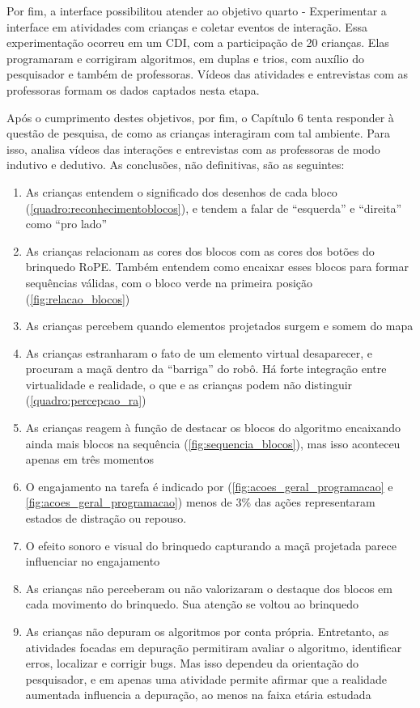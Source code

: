 Por fim, a interface possibilitou atender ao objetivo quarto - Experimentar a interface em atividades com crianças e coletar eventos de interação. Essa experimentação ocorreu em um CDI, com a participação de 20 crianças. Elas programaram e corrigiram algoritmos, em duplas e trios, com auxílio do pesquisador e também de professoras. Vídeos das atividades e entrevistas com as professoras formam os dados captados nesta etapa.

Após o cumprimento destes objetivos, por fim, o Capítulo 6 tenta responder à questão de pesquisa, de como as crianças interagiram com tal ambiente. Para isso, analisa vídeos das interações e entrevistas com as professoras de modo indutivo e dedutivo. As conclusões, não definitivas, são as seguintes:

\begin{enumerate}
    \item As crianças entendem o significado dos desenhos de cada bloco (\autoref{quadro:reconhecimentoblocos}), e tendem a falar de “esquerda” e “direita” como “pro lado”
    \item As crianças relacionam as cores dos blocos com as cores dos botões do brinquedo RoPE. Também entendem como encaixar esses blocos para formar sequências válidas, com o bloco verde na primeira posição (\autoref{fig:relacao_blocos})
    \item As crianças percebem quando elementos projetados surgem e somem do mapa
    \item As crianças estranharam o fato de um elemento virtual desaparecer, e procuram a maçã dentro da “barriga” do robô. Há forte integração entre virtualidade e realidade, o que e as crianças podem não distinguir (\autoref{quadro:percepcao_ra})
    \item As crianças reagem à função de destacar os blocos do algoritmo encaixando ainda mais blocos na sequência (\autoref{fig:sequencia_blocos}), mas isso aconteceu apenas em três momentos
    \item O engajamento na tarefa é indicado por (\autoref{fig:acoes_geral_programacao} e \autoref{fig:acoes_geral_programacao}) menos de 3\% das ações representaram estados de distração ou repouso. 
    \item O efeito sonoro e visual do brinquedo capturando a maçã projetada parece influenciar no engajamento
    \item As crianças não perceberam ou não valorizaram o destaque dos blocos em cada movimento do brinquedo. Sua atenção se voltou ao brinquedo
    \item As crianças não depuram os algoritmos por conta própria. Entretanto, as atividades focadas em depuração permitiram avaliar o algoritmo, identificar erros, localizar e corrigir bugs. Mas isso dependeu da orientação do pesquisador, e em apenas uma atividade permite afirmar que a realidade aumentada influencia a depuração, ao menos na faixa etária estudada

\end{enumerate}
